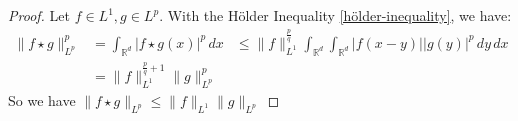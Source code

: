 \documentclass{report}
\theoremstyle{tommy}
\begin{document}
\begin{proof}
  Let \(f \in L^1, g \in L^p\). With the Hölder Inequality \ref{hölder-inequality}, we have:
  \begin{align*}
    \|f \star g\|_{L^p}^p
    &= \int_{\mathbb{R}^d} |f \star g(x)|^p \, dx
    &\le \|f\|_{L^1}^{\frac{p}{q}} \int_{\mathbb{R}^d} \int_{\mathbb{R}^d} |f(x-y)||g(y)|^p \, dy \, dx \\
    &= \| f \|_{L^1}^{\frac{p}{q} + 1} \|g\|_{L^p}^p
  \end{align*}
  So we have \(\| f \star g \|_{L^p} \le \|f\|_{L^1} \|g\|_{L^p}\)
\end{proof}
\end{document}
